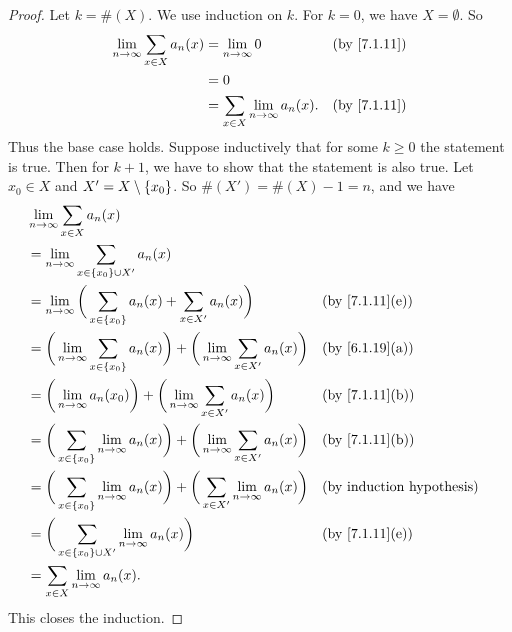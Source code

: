 \begin{proof}
  Let \(k = \#(X)\).
  We use induction on \(k\).
  For \(k = 0\), we have \(X = \emptyset\).
  So
  \begin{align*}
    \lim_{n \to \infty} \sum_{x \in X} a_n(x) & = \lim_{n \to \infty} 0                      &  & \by{7.1.11} \\
                                              & = 0                                                           \\
                                              & = \sum_{x \in X} \lim_{n \to \infty} a_n(x). &  & \by{7.1.11}
  \end{align*}
  Thus the base case holds.
  Suppose inductively that for some \(k \geq 0\) the statement is true.
  Then for \(k + 1\), we have to show that the statement is also true.
  Let \(x_0 \in X\) and \(X' = X \setminus \left\lbrace x_0\right\rbrace\).
  So \(\#(X') = \#(X) - 1 = n\), and we have
  \begin{align*}
     & \lim_{n \to \infty} \sum_{x \in X} a_n(x)                                                                                                    \\
     & = \lim_{n \to \infty} \sum_{x \in \set{x_0} \cup X'} a_n(x)                                                                                  \\
     & = \lim_{n \to \infty} \bigg(\sum_{x \in \set{x_0}} a_n(x) + \sum_{x \in X'} a_n(x)\bigg)                                 &  & \by{7.1.11}[e] \\
     & = \bigg(\lim_{n \to \infty} \sum_{x \in \set{x_0}} a_n(x)\bigg) + \bigg(\lim_{n \to \infty} \sum_{x \in X'} a_n(x)\bigg) &  & \by{6.1.19}[a] \\
     & = \bigg(\lim_{n \to \infty} a_n(x_0)\bigg) + \bigg(\lim_{n \to \infty} \sum_{x \in X'} a_n(x)\bigg)                      &  & \by{7.1.11}[b] \\
     & = \bigg(\sum_{x \in \set{x_0}} \lim_{n \to \infty} a_n(x)\bigg) + \bigg(\lim_{n \to \infty} \sum_{x \in X'} a_n(x)\bigg) &  & \by{7.1.11}[b] \\
     & = \bigg(\sum_{x \in \set{x_0}} \lim_{n \to \infty} a_n(x)\bigg) + \bigg(\sum_{x \in X'} \lim_{n \to \infty} a_n(x)\bigg) &  & \byIH          \\
     & = \bigg(\sum_{x \in \set{x_0} \cup X'} \lim_{n \to \infty} a_n(x)\bigg)                                                  &  & \by{7.1.11}[e] \\
     & = \sum_{x \in X} \lim_{n \to \infty} a_n(x).
  \end{align*}
  This closes the induction.
\end{proof}
